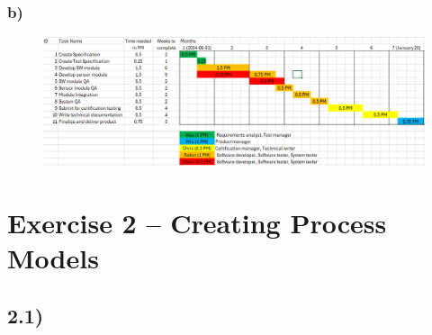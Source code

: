 \documentclass[a4paper]{scrartcl}
\begin{document}
\newpage 

\subsubsection*{b)}
\begin{figure}[h]
  \centering
  \includegraphics[width=1\textwidth]{1.4_Bonus_Gantt_Chart.PNG} %
  \caption{}
\end{figure}

\section*{Exercise 2 – Creating Process Models}

\subsection*{2.1)}
\end{document}
